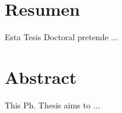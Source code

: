 \begingroup
\let\clearpage\relax
\let\cleardoublepage\relax
\let\cleardoublepage\relax

\chapter*{Resumen}
Esta Tesis Doctoral pretende ...

\vfill

\chapter*{Abstract}
This Ph. Thesis aims to ...


\endgroup

\vfill